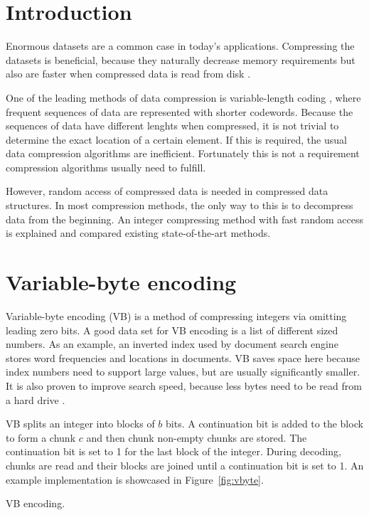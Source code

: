\chapter{Introduction}
Enormous datasets are a common case in today's applications. Compressing the datasets is beneficial, because they 
naturally decrease memory requirements but also are faster when compressed data is read from disk \citep{Zob95}.

One of the leading methods of data compression is variable-length coding \citep{Sal99}, where frequent sequences of data
are represented with shorter codewords. Because the sequences of data have different lenghts when compressed, it is 
not trivial to determine the exact location of a certain element. If this is required, the usual data compression algorithms are
inefficient. Fortunately this is not a requirement compression algorithms usually need to fulfill. 

However, random access of compressed data is needed in compressed data structures. In most compression methods, the only way 
to this is to decompress data from the beginning. An integer compressing method with fast random access is explained and compared
existing state-of-the-art methods.

\chapter{Variable-byte encoding}

Variable-byte encoding \citep{Wil99} (VB) is a method of compressing integers via omitting leading zero bits. A good data set for 
VB encoding is a list of different sized numbers. As an example, an inverted index used by document search engine stores word frequencies and 
locations in documents. VB saves space here because index numbers need to support large values, but are usually significantly smaller. 
It is also proven to improve search speed, because less bytes need to be read from a hard drive \citep{Sch02}.

VB splits an integer into blocks of $b$ bits. A continuation bit is added to the block to form a chunk $c$ and then chunk non-empty chunks are stored.
The continuation bit is set to 1 for the last block of the integer. During decoding, chunks are read and their blocks are joined until a continuation 
bit is set to 1. An example implementation is showcased in Figure~\ref{fig:vbyte}.


\begin{algorithm}
\LinesNumbered
{}
\caption{VB encoding.\label{fig:vbyte}}
\end{algorithm}


